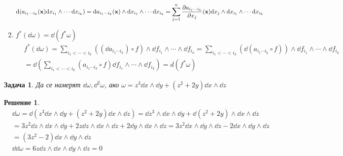 \documentclass[12pt]{article}
\newtheorem{problem}{Задача}
\newtheorem*{solution*}{Решение}
\newcommand\myxi[0]{\boldsymbol{\xi}}
\begin{document}
\begin{large}
\begin{enumerate}
  \begin{align*}
    \dd (a_{i_1 \cdots i_k}(\mathbf{x}) \dd x_{i_1} \wedge \cdots \dd x_{i_k})=\dd a_{i_1 \cdots i_k}(\mathbf{x}) \wedge \dd x_{i_1} \wedge \cdots \dd x_{i_k}=\sum_{j=1}^{n} \pdv{a_{i_1 \cdots i_k}}{x_j}(\mathbf{x}) \dd x_j \wedge \dd x_{i_1} \wedge \cdots \dd x_{i_k}
  \end{align*}
  \item $f^*(\dd \omega)=\dd(f^* \omega)$
  \begin{align*}
    &f^*(\dd \omega) = \sum_{i_1<\cdots<i_k} ((\dd a_{i_1 \cdots i_k}) \circ f) \wedge \dd f_{i_1} \wedge \cdots  \wedge \dd f_{i_k} = \sum_{i_1<\cdots<i_k} (\dd( a_{i_1 \cdots i_k} \circ f)) \wedge \dd f_{i_1} \wedge \cdots  \wedge \dd f_{i_k} \\
    &= \dd (\sum_{i_1<\cdots<i_k} ( a_{i_1 \cdots i_k} \circ f) \dd f_{i_1} \wedge \cdots  \wedge \dd f_{i_k}) = d(f^* \omega)
  \end{align*}
\end{enumerate}

\begin{problem}
  Да се намерят $\dd \omega, \dd^2 \omega$, ако $\omega = z^3 \dd x \wedge \dd y + (z^2+2y) \dd x \wedge \dd z$
\end{problem}

\begin{solution*}
  \begin{align*}
    &\dd \omega = \dd (z^3 \dd x \wedge \dd y + (z^2+2y) \dd x \wedge \dd z) = \dd z^3 \wedge \dd x \wedge \dd y + \dd(z^2+2y) \wedge \dd x \wedge \dd z \\
    &=3z^2 \dd z \wedge \dd x \wedge \dd y + 2z \dd z \wedge \dd x \wedge \dd z + 2 \dd y \wedge \dd x \wedge \dd z =3z^2 \dd x \wedge \dd y \wedge \dd z - 2 \dd x \wedge \dd y \wedge \dd z \\
    &=(3z^2-2)\dd x \wedge \dd y \wedge \dd z \\
    &\dd \dd \omega = 6 z \dd z \wedge \dd x \wedge \dd y \wedge \dd z = 0
  \end{align*}
\end{solution*}


\end{large}
\end{document}
